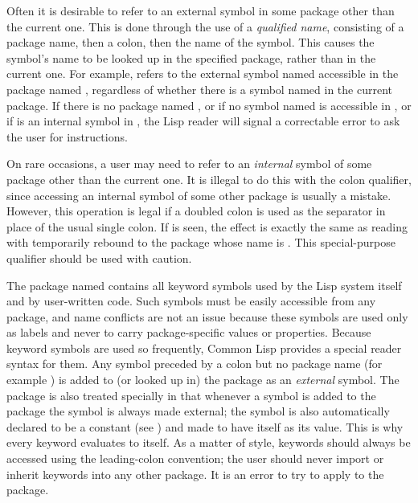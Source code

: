 Often it is desirable to refer to an external symbol in some package
other than the current one.  This is done through the use of a
{\it qualified name}, consisting of a package name, then a colon, then the
name of the symbol.  This causes the symbol's name to be looked up
in the specified package, rather than in the current one.  For example,
 refers to the external symbol named 
accessible in the package named , regardless of whether
there is a symbol named  in the current package.  If there
is no package named , or if no symbol named 
is accessible in , or if  is an internal
symbol in , the Lisp reader will signal
a correctable error to ask the user for instructions.

On rare occasions, a user may need to refer to an {\it internal} symbol of
some package other than the current one.  It is illegal to do this with
the colon qualifier, since accessing an internal symbol of some other
package is usually a mistake.  However, this operation is legal if
a doubled colon
\cd{::} is used as the separator in place of the usual single colon.  If
 is seen, the effect is exactly the same as
reading  with  temporarily rebound to the
package whose name is .  This special-purpose qualifier
should be used with caution.

The package named  contains all keyword symbols used by the
Lisp system itself and by user-written code.  Such symbols must be
easily accessible from any package, and name conflicts are not an issue
because these symbols are used only as labels and never to carry
package-specific values or properties.  Because keyword symbols are used
so frequently, Common Lisp provides a special reader syntax for them.
Any symbol preceded by a colon but no package name (for example
) is added to (or looked up in) the  package as
an {\it external} symbol.  The  package is also treated
specially in that whenever a symbol is added to the  package
the symbol is always made external; the symbol
is also automatically declared to be a constant
(see ) and made to
have itself as its value.  This is why every keyword evaluates to
itself.  As a matter of style, keywords should always be accessed using
the leading-colon convention; the user should never import or inherit
keywords into any other package.  It is an error to try to apply
 to the  package.

